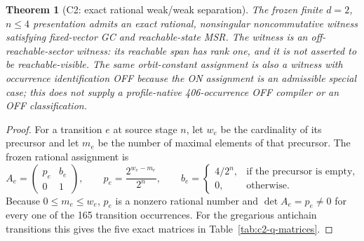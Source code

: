 \documentclass[11pt]{article}
\newtheorem{theorem}{Theorem}
\theoremstyle{definition}
\theoremstyle{remark}
\begin{document}
\begin{theorem}[C2: exact rational weak/weak separation]
\label{thm:c2}
The frozen finite \(d=2\), \(n\leq4\) presentation admits an exact rational,
nonsingular noncommutative witness satisfying fixed-vector GC and
reachable-state MSR.  The witness is an off-reachable-sector witness: its
reachable span has rank one, and it is not asserted to be reachable-visible.
The same orbit-constant assignment is also a witness with occurrence
identification OFF because the ON assignment is an admissible special case;
this does not supply a profile-native 406-occurrence OFF compiler or an OFF
classification.
\end{theorem}

\begin{proof}
For a transition \(e\) at source stage \(n\), let \(w_e\) be the cardinality
of its precursor and let \(m_e\) be the number of maximal elements of that
precursor.  The frozen rational assignment is
\[
 A_e=
 \begin{pmatrix}p_e&b_e\\0&1\end{pmatrix},
 \qquad
 p_e=\frac{2^{w_e-m_e}}{2^n},
 \qquad
 b_e=\begin{cases}
       4/2^n,&\text{if the precursor is empty},\\
       0,&\text{otherwise}.
     \end{cases}
\]
Because \(0\leq m_e\leq w_e\), \(p_e\) is a nonzero rational number and
\(\det A_e=p_e\neq0\) for every one of the 165 transition occurrences.
For the gregarious antichain transitions this gives the five exact matrices
in Table~\ref{tab:c2-q-matrices}.


\end{proof}
\end{document}
